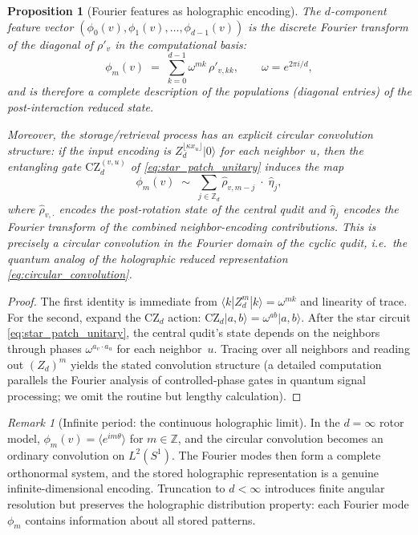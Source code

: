\documentclass[11pt,oneside]{amsbook}
\numberwithin{equation}{section}
\theoremstyle{plain}
\newtheorem{proposition}[theorem]{Proposition}
\theoremstyle{definition}
\theoremstyle{remark}
\newtheorem{remark}[theorem]{Remark}
\newcommand{\ket}[1]{\lvert #1 \rangle}
\begin{document}
\begin{proposition}[Fourier features as holographic encoding]
\label{prop:fourier_holographic}
The $d$-component feature vector $(\phi_0(v),\phi_1(v),\ldots,\phi_{d-1}(v))$ is the
\emph{discrete Fourier transform of the diagonal of $\rho'_v$ in the computational basis}:
\[
  \phi_m(v)
  \;=\;
  \sum_{k=0}^{d-1}\omega^{mk}\,\rho'_{v,kk},
  \qquad\omega = e^{2\pi i/d},
\]
and is therefore a complete description of the populations (diagonal entries) of the post-interaction
reduced state.

Moreover, the storage/retrieval process has an explicit circular convolution structure:
if the input encoding is $Z_d^{\lfloor\kappa x_u\rfloor}\ket{0}$ for each neighbor~$u$, then the
entangling gate $\mathrm{CZ}_d^{(v,u)}$ of \eqref{eq:star_patch_unitary} induces the map
\[
  \phi_m(v)
  \;\sim\;
  \sum_{j\in\mathbb{Z}_d}\hat\rho_{v,m-j}\;\cdot\;\hat\eta_j,
\]
where $\hat\rho_{v,\cdot}$ encodes the post-rotation state of the central qudit and $\hat\eta_j$
encodes the Fourier transform of the combined neighbor-encoding contributions.
This is precisely a \emph{circular convolution} in the Fourier domain of the cyclic qudit,
i.e.\ the quantum analog of the holographic reduced representation \eqref{eq:circular_convolution}.
\end{proposition}

\begin{proof}
The first identity is immediate from $\langle k|Z_d^m|k\rangle = \omega^{mk}$
and linearity of trace.
For the second, expand the $\mathrm{CZ}_d$ action:
$\mathrm{CZ}_d\ket{a,b}=\omega^{ab}\ket{a,b}$.
After the star circuit \eqref{eq:star_patch_unitary}, the central qudit's state depends
on the neighbors through phases $\omega^{a_v\cdot a_u}$ for each neighbor~$u$.
Tracing over all neighbors and reading out $(Z_d)^m$ yields the stated convolution structure
(a detailed computation parallels the Fourier analysis of controlled-phase gates in quantum
signal processing; we omit the routine but lengthy calculation).
\end{proof}

\begin{remark}[Infinite period: the continuous holographic limit]
In the $d=\infty$ rotor model, $\phi_m(v)=\langle e^{im\theta}\rangle$ for $m\in\mathbb{Z}$,
and the circular convolution becomes an ordinary convolution on $L^2(S^1)$.
The Fourier modes then form a complete orthonormal system, and the stored holographic
representation is a genuine infinite-dimensional encoding.
Truncation to $d<\infty$ introduces finite angular resolution but preserves the holographic
distribution property: each Fourier mode $\phi_m$ contains information about all stored patterns.
\end{remark}
\end{document}
